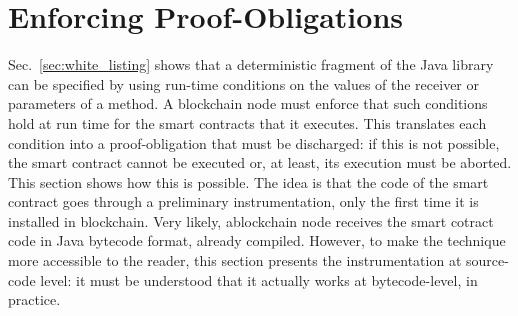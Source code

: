 \section{Enforcing Proof-Obligations}\label{sec:enforcing}

Sec.~\ref{sec:white_listing} shows that a deterministic fragment of the Java library
can be specified by using run-time conditions on the values of the receiver or
parameters of a method. A blockchain node must enforce that such conditions hold
at run time for the smart contracts that it executes. This translates each condition
into a proof-obligation that must be discharged: if this is not possible, the smart contract
cannot be executed or, at least, its execution must be aborted. This section shows how
this is possible. The idea is that the code of the smart contract goes through a
preliminary instrumentation, only the first time it is installed in blockchain.
Very likely, ablockchain node receives
the smart cotract code in Java bytecode format, already compiled.
However, to make the technique more accessible to the reader, this section presents
the instrumentation at source-code level: it must be understood that it actually
works at bytecode-level, in practice.

